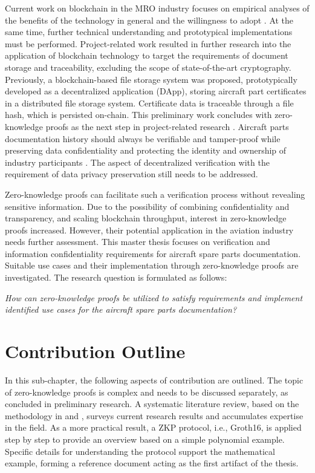 Current work on blockchain in the MRO industry focuses on empirical analyses of the benefits of the technology in general and the willingness to adopt \citep{efthymiou}. At the same time, further technical understanding and prototypical implementations must be performed. Project-related work resulted in further research into the application of blockchain technology to target the requirements of document storage and traceability, excluding the scope of state-of-the-art cryptography. Previously, a blockchain-based file storage system was proposed, prototypically developed as a decentralized application (DApp), storing aircraft part certificates in a distributed file storage system. Certificate data is traceable through a file hash, which is persisted on-chain. This preliminary work concludes with zero-knowledge proofs as the next step in project-related research \citep{ZedelJ}. Aircraft parts documentation history should always be verifiable and tamper-proof while preserving data confidentiality and protecting the identity and ownership of industry participants \citep{Wickboldt2019BlockchainFW}. The aspect of decentralized verification with the requirement of data privacy preservation still needs to be addressed.

Zero-knowledge proofs can facilitate such a verification process without revealing sensitive information. Due to the possibility of combining confidentiality and transparency, and scaling blockchain throughput, interest in zero-knowledge proofs increased. However, their potential application in the aviation industry needs further assessment. This master thesis focuses on verification and information confidentiality requirements for aircraft spare parts documentation. Suitable use cases and their implementation through zero-knowledge proofs are investigated. The research question is formulated as follows:

\begin{center}
\textit{How can zero-knowledge proofs be utilized to satisfy requirements and implement identified use cases for the aircraft spare parts documentation?}  
\end{center}

\section{Contribution Outline}
In this sub-chapter, the following aspects of contribution are outlined. The topic of zero-knowledge proofs is complex and needs to be discussed separately, as concluded in preliminary research. A systematic literature review, based on the methodology in \citet{vomBrockeJan2019TDgs} and \citet{Webster2002AnalyzingTP}, surveys current research results and accumulates expertise in the field. As a more practical result, a ZKP protocol, i.e., Groth16, is applied step by step to provide an overview based on a simple polynomial example. Specific details for understanding the protocol support the mathematical example, forming a reference document acting as the first artifact of the thesis.

